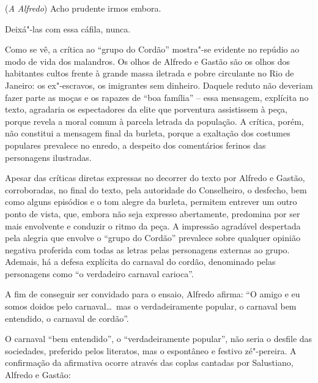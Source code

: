 \begin{hedraquote} 
 (\textit{A Alfredo}) Acho prudente irmos embora.

 Deixá"-las com essa cáfila, nunca.
\end{hedraquote} 

Como se vê, a crítica ao “grupo do Cordão” mostra"-se evidente no repúdio
ao modo de vida dos malandros. Os olhos de Alfredo e Gastão são os
olhos dos habitantes cultos frente à grande massa iletrada e pobre
circulante no Rio de Janeiro: os ex"-escravos, os imigrantes sem
dinheiro. Daquele reduto não deveriam fazer parte as moças e os rapazes
de “boa família” -- essa mensagem, explícita no texto, agradaria os
espectadores da elite que porventura assistissem à peça, porque revela
a moral comum à parcela letrada da população. A crítica, porém, não
constitui a mensagem final da burleta, porque a exaltação dos costumes
populares prevalece no enredo, a despeito dos comentários ferinos das
personagens ilustradas.

Apesar das críticas diretas expressas no decorrer do texto por
Alfredo e Gastão, corroboradas, no final do texto, pela autoridade do
Conselheiro, o desfecho, bem como alguns episódios e o tom alegre da
burleta, permitem entrever um outro ponto de vista, que, embora não
seja expresso abertamente, predomina por ser mais envolvente e conduzir
o ritmo da peça. A impressão agradável despertada pela alegria que
envolve o “grupo do Cordão” prevalece sobre qualquer opinião negativa
proferida com todas as letras pelas personagens externas ao grupo.
Ademais, há a defesa explícita do carnaval do cordão, denominado pelas
personagens como “o verdadeiro carnaval carioca”.

A fim de conseguir ser convidado para o ensaio, Alfredo afirma:
``O amigo e eu somos doidos pelo carnaval\ldots\ mas o verdadeiramente
popular, o carnaval bem entendido, o carnaval de cordão''.

O carnaval “bem entendido”, o “verdadeiramente popular”, não seria o
desfile das sociedades, preferido pelos literatos, mas o espontâneo e
festivo zé"-pereira. A confirmação da afirmativa ocorre através das
coplas cantadas por Salustiano, Alfredo e Gastão:

